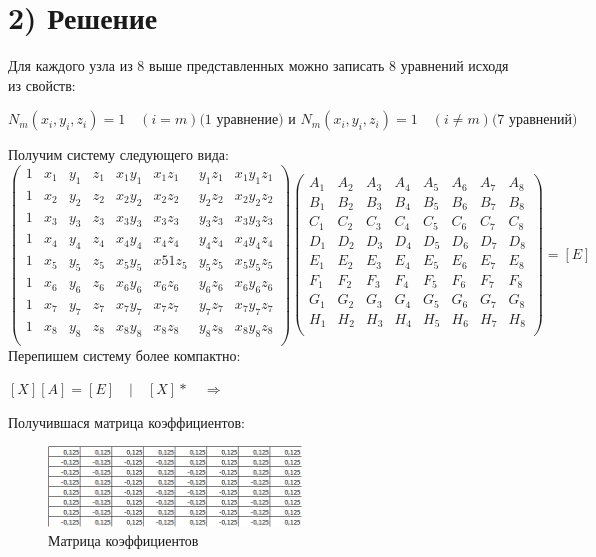 \documentclass[]{article}
\begin{document}
	\section*{2) Решение}
		Для каждого узла из 8 выше представленных можно записать 8 уравнений исходя из свойств:\\
		\begin{center}
			$N_m(x_i,y_i,z_i)=1 \quad (i=m) \text{(1 уравнение) и } N_m(x_i,y_i,z_i)=1 \quad (i\neq m) \text{(7 уравнений)} $
		\end{center}
		Получим систему следующего вида:\\
		\[\begin{pmatrix}
			1&x_1&y_1&z_1&x_1y_1&x_1z_1&y_1z_1&x_1y_1z_1\\
			1&x_2&y_2&z_2&x_2y_2&x_2z_2&y_2z_2&x_2y_2z_2\\
			1&x_3&y_3&z_3&x_3y_3&x_3z_3&y_3z_3&x_3y_3z_3\\
			1&x_4&y_4&z_4&x_4y_4&x_4z_4&y_4z_4&x_4y_4z_4\\
			1&x_5&y_5&z_5&x_5y_5&x51z_5&y_5z_5&x_5y_5z_5\\
			1&x_6&y_6&z_6&x_6y_6&x_6z_6&y_6z_6&x_6y_6z_6\\
			1&x_7&y_7&z_7&x_7y_7&x_7z_7&y_7z_7&x_7y_7z_7\\
			1&x_8&y_8&z_8&x_8y_8&x_8z_8&y_8z_8&x_8y_8z_8\\
		\end{pmatrix}
		\begin{pmatrix}
			A_1&A_2&A_3&A_4&A_5&A_6&A_7&A_8\\
			B_1&B_2&B_3&B_4&B_5&B_6&B_7&B_8\\
			C_1&C_2&C_3&C_4&C_5&C_6&C_7&C_8\\
			D_1&D_2&D_3&D_4&D_5&D_6&D_7&D_8\\
			E_1&E_2&E_3&E_4&E_5&E_6&E_7&E_8\\
			F_1&F_2&F_3&F_4&F_5&F_6&F_7&F_8\\
			G_1&G_2&G_3&G_4&G_5&G_6&G_7&G_8\\
			H_1&H_2&H_3&H_4&H_5&H_6&H_7&H_8\\
		\end{pmatrix}
		=[E]\]
		\newpage
		Перепишем систему более компактно:\\
		\begin{center}
			$[X][A]=[E] \quad | \quad [X]* \quad \Rightarrow$ 
		\end{center}
		Получившася матрица коэффициентов:
		\begin{center}
			\begin{figure}[H]
				\centering
				\includegraphics[width=0.6\textwidth]{kofs}
				\caption{Матрица коэффициентов}
				\label{рис. 2}
			\end{figure}
		\end{center}
\end{document}
